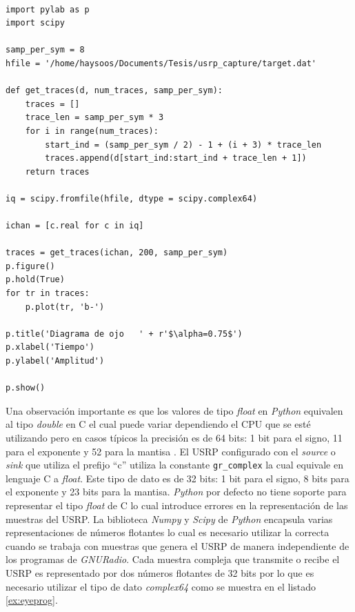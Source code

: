 \begin{lstlisting}[float, label=ex:eyeprog, caption={Programa que genera el diagrama de ojo a partir
de muestras tomadas del USRP.}, breaklines=true]

import pylab as p
import scipy

samp_per_sym = 8
hfile = '/home/haysoos/Documents/Tesis/usrp_capture/target.dat'

def get_traces(d, num_traces, samp_per_sym):
    traces = []
    trace_len = samp_per_sym * 3
    for i in range(num_traces):
        start_ind = (samp_per_sym / 2) - 1 + (i + 3) * trace_len
        traces.append(d[start_ind:start_ind + trace_len + 1])
    return traces
    
iq = scipy.fromfile(hfile, dtype = scipy.complex64)

ichan = [c.real for c in iq]

traces = get_traces(ichan, 200, samp_per_sym)
p.figure()
p.hold(True)
for tr in traces:
    p.plot(tr, 'b-')

p.title('Diagrama de ojo   ' + r'$\alpha=0.75$')
p.xlabel('Tiempo')
p.ylabel('Amplitud')

p.show()
\end{lstlisting}

Una observaci\'on importante es que los valores de tipo \emph{float} en \emph{Python} equivalen al tipo
\emph{double} en C el cual puede variar dependiendo el CPU que se est\'e utilizando pero en casos
t\'ipicos la precisi\'on es de 64 bits: 1 bit para el signo, 11 para el exponente y 52 para la mantisa
\cite{python}. El USRP configurado con el \emph{source} o \emph{sink} que utiliza el prefijo ``c''
utiliza la constante \verb|gr_complex| la cual equivale en lenguaje C a \emph{float}. Este tipo de
dato es de 32 bits: 1 bit para el signo, 8 bits para el exponente y 23 bits para la mantisa. \emph{Python}
por defecto no tiene soporte para representar el tipo \emph{float} de C lo cual introduce errores en la
representaci\'on de las muestras del USRP. La biblioteca \emph{Numpy} y \emph{Scipy} de \emph{Python} encapsula
varias representaciones de n\'umeros flotantes \cite{scipy} lo cual es necesario utilizar la correcta
cuando se trabaja con muestras que genera el USRP de manera independiente de los programas de
\emph{GNURadio}. Cada muestra compleja que transmite o recibe el USRP es representado por dos
n\'umeros flotantes de 32 bits por lo que es necesario utilizar el tipo de dato \emph{complex64} como
se muestra en el listado \ref{ex:eyeprog}.

